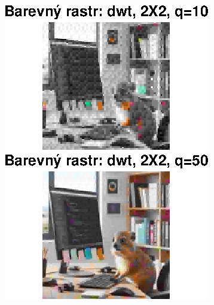 \begin{figure}[H]
    \centering
    \begin{minipage}[b]{0.3\textwidth}
        \centering
        \includegraphics[width=\textwidth]{images/barevny_dwt_2X2_q10.eps}
    \end{minipage}
    \hfill
    \begin{minipage}[b]{0.3\textwidth}
        \centering
        \includegraphics[width=\textwidth]{images/barevny_dwt_2X2_q50.eps}
    \end{minipage}
    \hfill
    \begin{minipage}[b]{0.3\textwidth}
        \centering

\end{minipage}
\end{figure}
